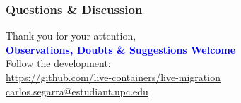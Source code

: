 \documentclass[9pt,    %
    english,            %
    xcolor=table,       %
    envcountsect,        %
    aspectratio=169     %
]{beamer}
\begin{document}
\begin{frame}
    \frametitle{Questions \& Discussion}

    \vspace{15pt}

    \begin{center}
        Thank you for your attention,\\[5pt]

        \Large
        \textbf{\textcolor{blue}{Observations, Doubts \& Suggestions Welcome}}\\[25pt]

        \normalsize
        Follow the development:\\ \url{https://github.com/live-containers/live-migration}\\[15pt]
        \url{carlos.segarra@estudiant.upc.edu}
    \end{center}
\end{frame}
\end{document}
